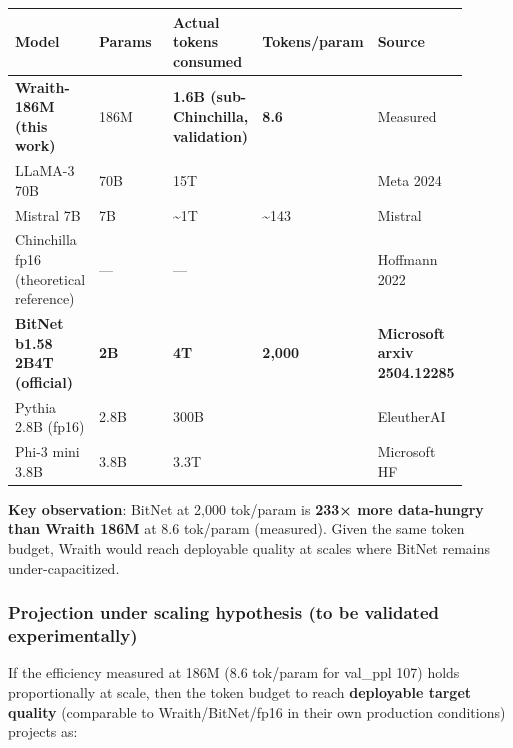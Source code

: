 {\def\LTcaptype{none} %
{\footnotesize\setlength{\tabcolsep}{3pt}
\begin{longtable}[]{@{}>{\raggedright\arraybackslash}p{0.180\linewidth}>{\raggedright\arraybackslash}p{0.180\linewidth}>{\raggedright\arraybackslash}p{0.180\linewidth}>{\raggedright\arraybackslash}p{0.180\linewidth}>{\raggedright\arraybackslash}p{0.180\linewidth}@{}}
\toprule\noalign{}
Model & Params & Actual tokens consumed & Tokens/param & Source \\
\midrule\noalign{}
\endhead
\bottomrule\noalign{}
\endlastfoot
\textbf{Wraith-186M (this work)} & 186M & \textbf{1.6B (sub-Chinchilla,
validation)} & \textbf{8.6} & Measured \\
LLaMA-3 70B & 70B & 15T & 214 & Meta 2024 \\
Mistral 7B & 7B & \textasciitilde1T & \textasciitilde143 & Mistral \\
Chinchilla fp16 (theoretical reference) & --- & --- & 20 & Hoffmann
2022 \\
\textbf{BitNet b1.58 2B4T (official)} & \textbf{2B} & \textbf{4T} &
\textbf{2,000} & \textbf{Microsoft arxiv 2504.12285} \\
Pythia 2.8B (fp16) & 2.8B & 300B & 107 & EleutherAI \\
Phi-3 mini 3.8B & 3.8B & 3.3T & 868 & Microsoft HF \\
\end{longtable}
}
}

\textbf{Key observation}: BitNet at 2,000 tok/param is \textbf{233× more
data-hungry than Wraith 186M} at 8.6 tok/param (measured). Given the
same token budget, Wraith would reach deployable quality at scales where
BitNet remains under-capacitized.

\subsubsection{Projection under scaling hypothesis (to be validated
experimentally)}\label{projection-under-scaling-hypothesis-to-be-validated-experimentally}

If the efficiency measured at 186M (8.6 tok/param for val\_ppl 107)
holds proportionally at scale, then the token budget to reach
\textbf{deployable target quality} (comparable to Wraith/BitNet/fp16 in
their own production conditions) projects as:

